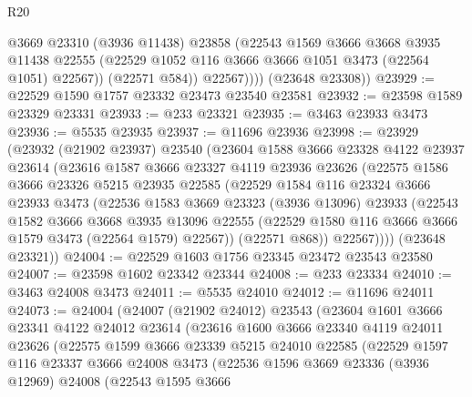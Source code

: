 \begin{lexlean}{R20}
\begin{coremodule}
                @3669
                @23310
                (@3936 @11438)
                @23858
                (@22543
                  @1569
                  @3666
                  @3668
                  @3935
                  @11438
                  @22555
                  (@22529 @1052 @116 @3666 @3666 @1051 @3473 (@22564 @1051) @22567))
                (@22571 @584))
              @22567))))
      (@23648 @23308))
@23929 := @22529 @1590 @1757 @23332 @23473 @23540 @23581
@23932 := @23598 @1589 @23329 @23331
@23933 := @233 @23321
@23935 := @3463 @23933 @3473
@23936 := @5535 @23935
@23937 := @11696 @23936
@23998 := @23929
    (@23932
      (@21902 @23937)
      @23540
      (@23604
        @1588
        @3666
        @23328
        @4122
        @23937
        @23614
        (@23616
          @1587
          @3666
          @23327
          @4119
          @23936
          @23626
          (@22575
            @1586
            @3666
            @23326
            @5215
            @23935
            @22585
            (@22529
              @1584
              @116
              @23324
              @3666
              @23933
              @3473
              (@22536
                @1583
                @3669
                @23323
                (@3936 @13096)
                @23933
                (@22543
                  @1582
                  @3666
                  @3668
                  @3935
                  @13096
                  @22555
                  (@22529 @1580 @116 @3666 @3666 @1579 @3473 (@22564 @1579) @22567))
                (@22571 @868))
              @22567))))
      (@23648 @23321))
@24004 := @22529 @1603 @1756 @23345 @23472 @23543 @23580
@24007 := @23598 @1602 @23342 @23344
@24008 := @233 @23334
@24010 := @3463 @24008 @3473
@24011 := @5535 @24010
@24012 := @11696 @24011
@24073 := @24004
    (@24007
      (@21902 @24012)
      @23543
      (@23604
        @1601
        @3666
        @23341
        @4122
        @24012
        @23614
        (@23616
          @1600
          @3666
          @23340
          @4119
          @24011
          @23626
          (@22575
            @1599
            @3666
            @23339
            @5215
            @24010
            @22585
            (@22529
              @1597
              @116
              @23337
              @3666
              @24008
              @3473
              (@22536
                @1596
                @3669
                @23336
                (@3936 @12969)
                @24008
                (@22543
                  @1595
                  @3666

\end{coremodule}
\end{lexlean}
